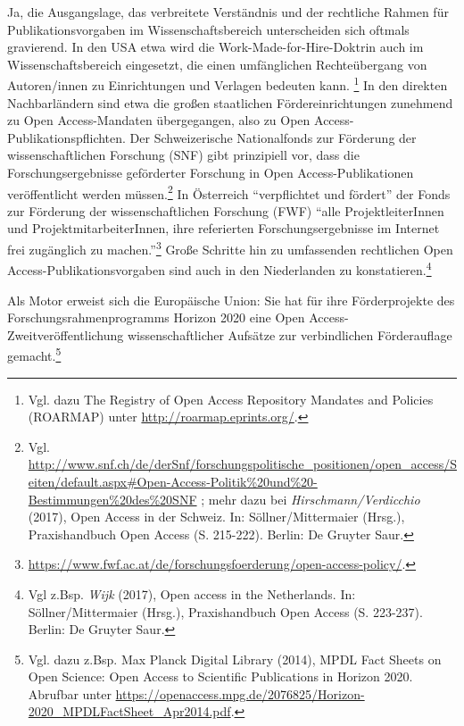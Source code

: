 \documentclass[a4paper,
fontsize=11pt,
oneside,
numbers=noperiodatend,
parskip=half-,
bibliography=totoc,
final
]{scrartcl}
\begin{document}
Ja, die Ausgangslage, das verbreitete Verständnis und der rechtliche
Rahmen für Publikationsvorgaben im Wissenschaftsbereich unterscheiden
sich oftmals gravierend. In den USA etwa wird die
Work-Made-for-Hire-Doktrin auch im Wissenschaftsbereich eingesetzt, die
einen umfänglichen Rechteübergang von Autoren/innen zu Einrichtungen und
Verlagen bedeuten kann. \footnote{Vgl. dazu The Registry of Open Access
  Repository Mandates and Policies (ROARMAP) unter
  \url{http://roarmap.eprints.org/}.} In den direkten Nachbarländern
sind etwa die großen staatlichen Fördereinrichtungen zunehmend zu Open
Access-Mandaten übergegangen, also zu Open Access-Publikationspflichten.
Der Schweizerische Nationalfonds zur Förderung der wissenschaftlichen
Forschung (SNF) gibt prinzipiell vor, dass die Forschungsergebnisse
geförderter Forschung in Open Access-Pub\-li\-ka\-ti\-onen veröffentlicht werden
müssen.\footnote{Vgl.
  \url{http://www.snf.ch/de/derSnf/forschungspolitische_positionen/open_access/Seiten/default.aspx\#Open-Access-Politik\%20und\%20-Bestimmungen\%20des\%20SNF}
  ; mehr dazu bei \emph{Hirschmann/Verdicchio} (2017), Open Access in
  der Schweiz. In: Söllner/Mittermaier (Hrsg.), Praxishandbuch Open
  Access (S. 215-222). Berlin: De Gruyter Saur.} In Österreich
\enquote{verpflichtet und fördert} der Fonds zur Förderung der
wissenschaftlichen Forschung (FWF) \enquote{alle ProjektleiterInnen und
ProjektmitarbeiterInnen, ihre referierten Forschungsergebnisse im
Internet frei zugänglich zu machen.}\footnote{\url{https://www.fwf.ac.at/de/forschungsfoerderung/open-access-policy/}.}
Große Schritte hin zu umfassenden rechtlichen Open
Access-Publikationsvorgaben sind auch in den Niederlanden zu
konstatieren.\footnote{Vgl z.Bsp. \emph{Wijk} (2017), Open access in the
  Netherlands. In: Söllner/Mittermaier (Hrsg.), Praxishandbuch Open
  Access (S. 223-237). Berlin: De Gruyter Saur.}

Als Motor erweist sich die Europäische Union: Sie hat für ihre
Förderprojekte des Forschungsrahmenprogramms Horizon 2020 eine Open
Access-Zweitveröffentlichung wissenschaftlicher Aufsätze zur
verbindlichen Förderauflage gemacht.\footnote{Vgl. dazu z.Bsp. Max
  Planck Digital Library (2014), MPDL Fact Sheets on Open Science: Open
  Access to Scientific Publications in Horizon 2020. Abrufbar unter
  \url{https://openaccess.mpg.de/2076825/Horizon-2020_MPDLFactSheet_Apr2014.pdf}.}
\end{document}
